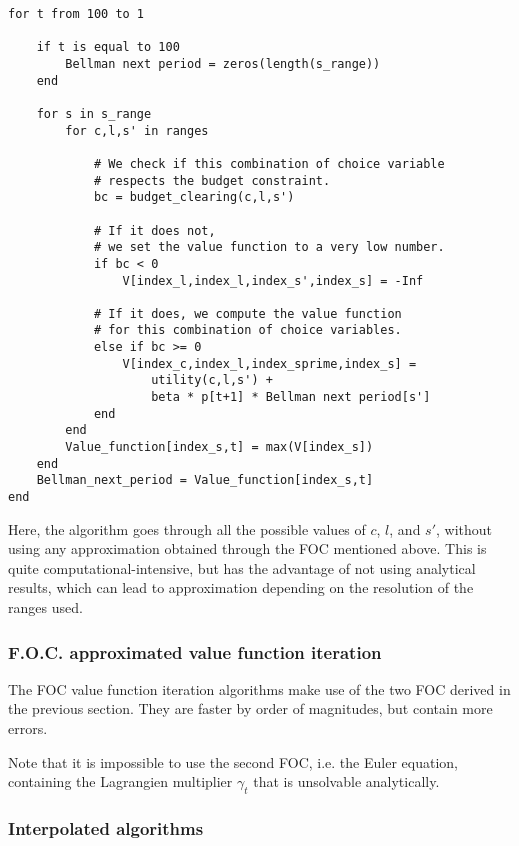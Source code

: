 \documentclass{article}
\begin{document}
\begin{lstlisting}
for t from 100 to 1
    
    if t is equal to 100
        Bellman next period = zeros(length(s_range))
    end

    for s in s_range
        for c,l,s' in ranges
            
            # We check if this combination of choice variable 
            # respects the budget constraint. 
            bc = budget_clearing(c,l,s') 

            # If it does not,
            # we set the value function to a very low number.
            if bc < 0
                V[index_l,index_l,index_s',index_s] = -Inf 
            
            # If it does, we compute the value function 
            # for this combination of choice variables.
            else if bc >= 0
                V[index_c,index_l,index_sprime,index_s] =
                    utility(c,l,s') +
                    beta * p[t+1] * Bellman next period[s']
            end
        end
        Value_function[index_s,t] = max(V[index_s])
    end
    Bellman_next_period = Value_function[index_s,t]
end
\end{lstlisting}

Here, the algorithm goes through all the possible values of
$c$, $l$, and $s'$, without using any approximation obtained 
through the FOC mentioned above. 
This is quite computational-intensive, but 
has the advantage of not using analytical results, 
which can lead to approximation depending on the resolution of the 
ranges used.

\subsubsection{F.O.C. approximated value function iteration}

The FOC value function iteration algorithms make use of the two FOC
derived in the previous section. 
They are faster by order of magnitudes, but contain more errors.

Note that it is impossible to use the second FOC, i.e. the 
Euler equation, containing the 
Lagrangien multiplier $\gamma_{t}$ that
is unsolvable analytically. 

\subsubsection{Interpolated algorithms}
\end{document}
